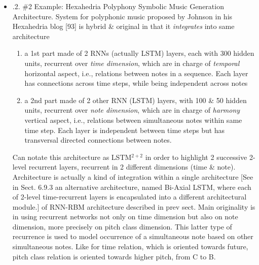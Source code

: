 \documentclass{article}
\begin{document}
\begin{itemize}
\begin{itemize}
\begin{itemize}
\begin{itemize}
				{.1.1. Other RNN-RBM Systems.} There have been a few systems following on \& extending RNN-RBM architecture, but they are not significantly different \& furthermore they have not been thoroughly evaluated. However, worth mentioning following:
				\begin{enumerate}
					\item RNN-DBN architecture [This is apparently state of art for {\sc J. S. Bach} Chorales dataset in terms of cross-entropy loss.], using multiple hidden layers [60]
					\item LSTM-RTRBM architecture, using an LSTM instead of an RNN [120].
				\end{enumerate}
			\end{itemize}
			\item {.2. \#2 Example: Hexahedria Polyphony Symbolic Music Generation Architecture.} System for polyphonic music proposed by {\sc Johnson} in his Hexahedria blog [93] is hybrid \& original in that it {\it integrates} into same architecture
			\begin{enumerate}
				\item a 1st part made of 2 RNNs (actually LSTM) layers, each with 300 hidden units, recurrent over {\it time dimension}, which are in charge of {\it temporal} horizontal aspect, i.e., relations between notes in a sequence. Each layer has connections across time steps, while being independent across notes
				\item a 2nd part made of 2 other RNN (LSTM) layers, with 100 \& 50 hidden units, recurrent over {\it note dimension}, which are in charge of {\it harmony} vertical aspect, i.e., relations between simultaneous notes within same time step. Each layer is independent between time steps but has transversal directed connections between notes.
			\end{enumerate}
			Can notate this architecture as LSTM${}^{2+2}$ in order to highlight 2 successive 2-level recurrent layers, recurrent in 2 different dimensions (time \& note). Architecture is actually a kind of integration within a single architecture [See in Sect. 6.9.3 an alternative architecture, named Bi-Axial LSTM, where each of 2-level time-recurrent layers is encapsulated into a different architectural module.] of RNN-RBM architecture described in prev sect. Main originality is in using recurrent networks not only on time dimension but also on note dimension, more precisely on pitch class dimension. This latter type of recurrence is used to model occurrence of a simultaneous note based on other simultaneous notes. Like for time relation, which is oriented towards future, pitch class relation is oriented towards higher pitch, from C to B.


\end{itemize}
\end{itemize}
\end{itemize}
\end{document}
